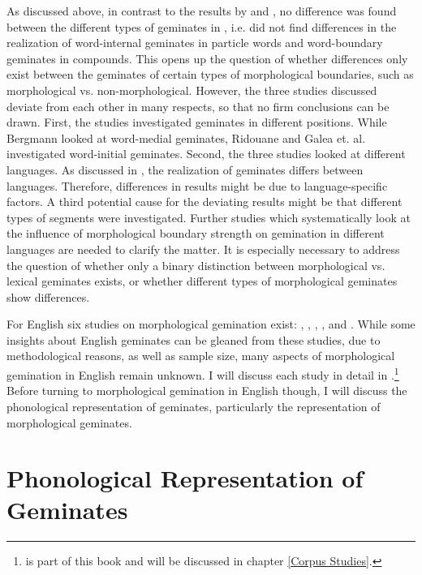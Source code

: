 As discussed above, in contrast to the results by \cite{Ridouane.2010} and \cite{Galea.2014}, no difference was found between the different types of geminates in \cite{Bergmann.2017}, i.e. \cite{Bergmann.2017} did not find differences in the realization of word-internal geminates in particle words and word-boundary geminates in compounds. This opens up the question of whether differences only exist between the geminates of certain types of morphological boundaries, such as morphological vs. non-morphological. However, the three studies discussed deviate from each other in many respects, so that no firm conclusions can be drawn. First, the studies investigated geminates in different positions. While Bergmann looked at word-medial geminates, Ridouane and Galea et. al. investigated word-initial geminates. Second, the three studies looked at different languages. As discussed in , the realization of geminates differs between languages. Therefore, differences in results might be due to language-specific factors. A third potential cause for the deviating results might be that different types of segments were investigated. Further studies which systematically look at the influence of morphological boundary strength on gemination in different languages are needed to clarify the matter. It is especially necessary to address the question of whether only a binary distinction between morphological vs. lexical geminates exists, or whether different types of morphological geminates show differences.


For English six studies on morphological gemination exist: \cite{Delattre.}, \citet{Kaye.2005}, \citet{Oh.2012}, \cite{Oh.2013}, \cite{Kotzor.2016} and \cite{BenHedia.2017}. While some insights about English geminates can be gleaned from these studies, due to methodological reasons, as well as sample size, many aspects of morphological gemination in English remain unknown. I will discuss each study in detail in .\footnote{\cite{BenHedia.2017} is part of this book and will be discussed in chapter \ref{Corpus Studies}.} Before turning to morphological gemination in English though, I will discuss the phonological representation of geminates, particularly the representation of morphological geminates.



\section{Phonological Representation of Geminates } \label{Phonological representation of geminates}

